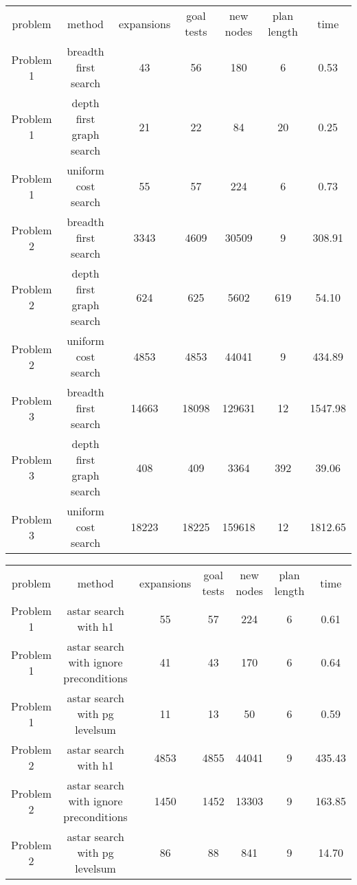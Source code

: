 \documentclass[12pt,a4paper]{article}
\begin{document}
\begin{landscape}
\begin{center}
\begin{tabular}[pos]{c|c|c|c|c|c|c}
problem   & method                   & expansions & goal tests & new nodes & plan length & time \\
Problem 1 & breadth first search     & 43         & 56 & 180   & 6  & 0.53 \\
Problem 1 & depth first graph search & 21         & 22 & 84    & 20 & 0.25 \\
Problem 1 & uniform cost search      & 55         & 57 & 224   & 6  & 0.73 \\

Problem 2 & breadth first search     & 3343       & 4609 & 30509 & 9   & 308.91 \\
Problem 2 & depth first graph search & 624        & 625  & 5602  & 619 & 54.10 \\
Problem 2 & uniform cost search      & 4853       & 4853 & 44041 & 9   & 434.89 \\

Problem 3 & breadth first search     & 14663      & 18098 & 129631 & 12   & 1547.98 \\
Problem 3 & depth first graph search & 408        & 409   & 3364   & 392  & 39.06 \\
Problem 3 & uniform cost search      & 18223      & 18225 & 159618 & 12   & 1812.65 \\
\end{tabular}
\end{center}

\begin{center}
\begin{tabular}[pos]{c|c|c|c|c|c|c}
problem   & method                   & expansions & goal tests & new nodes & plan length & time \\
Problem 1 & astar search with h1     & 55         & 57         & 224       & 6           & 0.61 \\
Problem 1 & astar search with ignore preconditions     & 41         & 43         & 170       & 6           & 0.64 \\
Problem 1 & astar search with pg levelsum     & 11         & 13         & 50       & 6           & 0.59 \\

Problem 2 & astar search with h1     & 4853         & 4855         & 44041       & 9           & 435.43 \\
Problem 2 & astar search with ignore preconditions     & 1450         & 1452         & 13303       & 9           & 163.85 \\
Problem 2 & astar search with pg levelsum     & 86         & 88         & 841       & 9           & 14.70 \\


\end{tabular}
\end{center}
\end{landscape}
\end{document}
